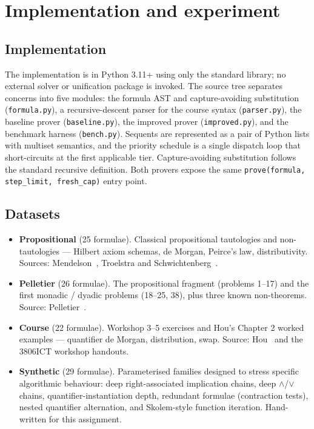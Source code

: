\documentclass[runningheads]{llncs}
\begin{document}
\section{Implementation and experiment}
\label{sec:impl}

\subsection{Implementation}
\label{sec:implementation}


The implementation is in Python 3.11+ using only the standard library;
no external solver or unification package is invoked. The source tree
separates concerns into five modules: the formula AST and capture-avoiding
substitution (\texttt{formula.py}), a recursive-descent parser for the
course syntax (\texttt{parser.py}), the baseline prover
(\texttt{baseline.py}), the improved prover (\texttt{improved.py}), and
the benchmark harness (\texttt{bench.py}). Sequents are represented as a
pair of Python lists with multiset semantics, and the priority schedule
is a single dispatch loop that short-circuits at the first applicable
tier. Capture-avoiding substitution follows the standard recursive
definition. Both provers expose the same
\texttt{prove(formula,\,step\_limit,\,fresh\_cap)} entry point.

\subsection{Datasets}
\label{sec:datasets}


\begin{itemize}
\item \textbf{Propositional} (25 formulae). Classical propositional
  tautologies and non-tautologies — Hilbert axiom schemas, de Morgan,
  Peirce's law, distributivity. Sources: Mendelson~\cite{Mendelson1997},
  Troelstra and Schwichtenberg~\cite{TroelstraSchwichtenberg2000}.
\item \textbf{Pelletier} (26 formulae). The propositional fragment
  (problems 1--17) and the first monadic / dyadic problems (18--25, 38),
  plus three known non-theorems. Source:
  Pelletier~\cite{Pelletier1986}.
\item \textbf{Course} (22 formulae). Workshop 3--5 exercises and Hou's
  Chapter 2 worked examples — quantifier de Morgan, distribution, swap.
  Source: Hou~\cite{Hou2021} and the 3806ICT workshop handouts.
\item \textbf{Synthetic} (29 formulae). Parameterised families designed to
  stress specific algorithmic behaviour: deep right-associated implication
  chains, deep $\wedge$/$\vee$ chains, quantifier-instantiation depth,
  redundant formulae (contraction tests), nested quantifier alternation,
  and Skolem-style function iteration. Hand-written for this assignment.
\end{itemize}
\end{document}
